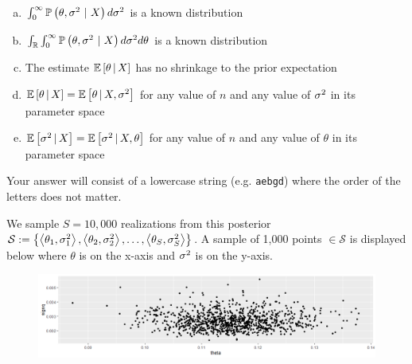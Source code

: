 \documentclass[12pt,landscape]{article}
\newcommand{\instr}{\small Your answer will consist of a lowercase string (e.g. \texttt{aebgd}) where the order of the letters does not matter. \normalsize}
\begin{document}
\begin{enumerate}[(a)]
\item $\int_0^\infty \mathbb{P}\left(\theta, \sigma^2~|~X\right) d\sigma^2$ is a known distribution
\item $\int_{\mathbb{R}} \int_0^\infty \mathbb{P}\left(\theta, \sigma^2~|~X\right) d\sigma^2 d\theta$ is a known distribution
\item The estimate $\mathbb{E}\left[\theta\,|\,X\right]$ has no shrinkage to the prior expectation
\item $\mathbb{E}\left[\theta\,|\,X\right] = \mathbb{E}\left[\theta\,|\,X, \sigma^2\right]$ for any value of $n$ and any value of $\sigma^2$ in its parameter space
\item $\mathbb{E}\left[\sigma^2\,|\,X\right] = \mathbb{E}\left[\sigma^2\,|\,X, \theta\right]$ for any value of $n$ and any value of $\theta$ in its parameter space
\end{enumerate}
\eenum\instr\pagebreak



\problem{}  We sample $S = 10,000$ realizations from this posterior $\mathcal{S} := \left\{\left<\theta_1, \sigma^2_1\right>, \left<\theta_2, \sigma^2_2\right>, \ldots, \left<\theta_S, \sigma^2_S\right>\right\}$. A sample of 1,000 points $\in \mathcal{S}$ is displayed below where $\theta$ is on the x-axis and $\sigma^2$ is on the y-axis.



\vspace{-0.3cm}
\begin{figure}[h]
\centering
\includegraphics[width=8in]{theta_sigsqs.png}
\end{figure}

\vspace{-0.2cm}\benum{} 
\end{document}
